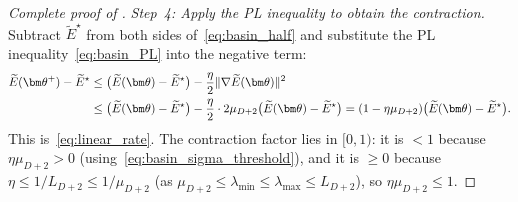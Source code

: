 \documentclass[11pt]{article}
\theoremstyle{plain}
\theoremstyle{plain}
\begin{document}
\begin{proof}[Complete proof of ]
\emph{Step~4: Apply the PL inequality to obtain the contraction.}
Subtract $\widetilde{E}^\star$ from both sides
of~\eqref{eq:basin_half} and substitute the PL
inequality~\eqref{eq:basin_PL} into the negative term:
\begin{align}
  \widetilde{E}(\bm\theta^+)-\widetilde{E}^\star
  &\le\bigl(\widetilde{E}(\bm\theta)-\widetilde{E}^\star\bigr)
  -\frac{\eta}{2}\|\nabla\widetilde{E}(\bm\theta)\|^2
  \notag\\
  &\le\bigl(\widetilde{E}(\bm\theta)-\widetilde{E}^\star\bigr)
  -\frac{\eta}{2}\cdot 2\mu_{D+2}
    \bigl(\widetilde{E}(\bm\theta)-\widetilde{E}^\star\bigr)
  =(1-\eta\mu_{D+2})
  \bigl(\widetilde{E}(\bm\theta)-\widetilde{E}^\star\bigr).
  \label{eq:basin_contraction}
\end{align}
This is~\eqref{eq:linear_rate}.  The contraction factor lies in
$[0,1)$: it is $<1$ because $\eta\mu_{D+2}>0$
(using~\eqref{eq:basin_sigma_threshold}), and it is $\ge0$ because
$\eta\le 1/L_{D+2}\le 1/\mu_{D+2}$ (as $\mu_{D+2}\le\lambda_{\min}
\le\lambda_{\max}\le L_{D+2}$), so $\eta\mu_{D+2}\le1$.


\end{proof}
\end{document}
